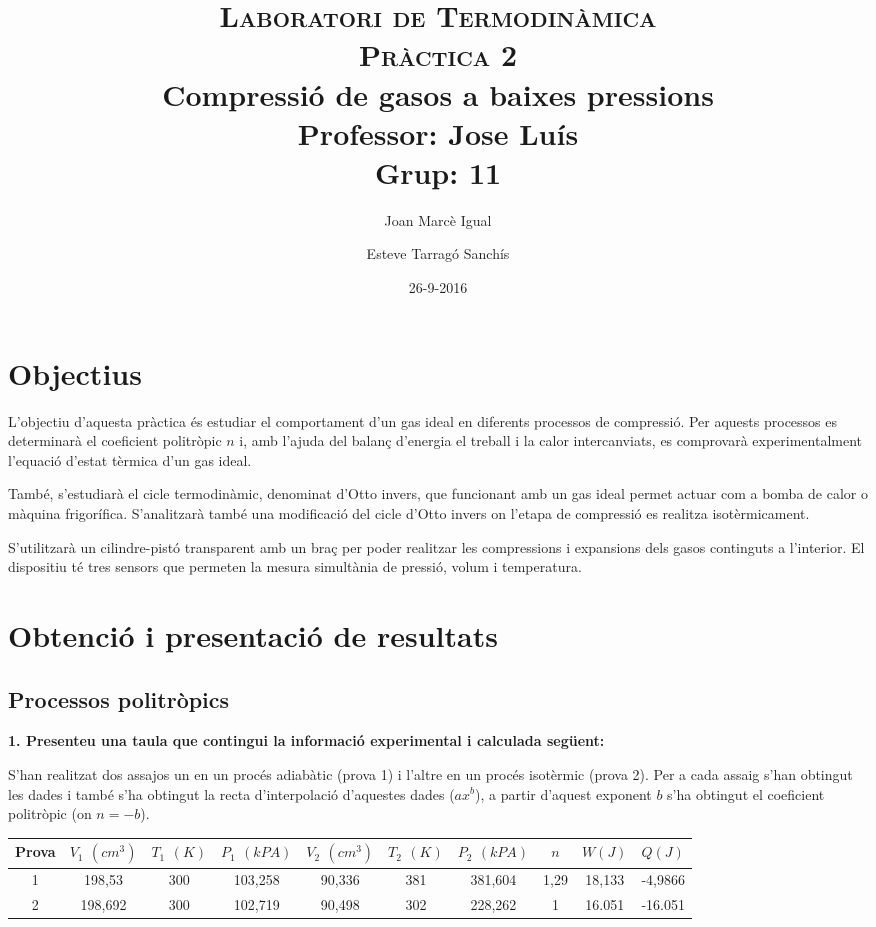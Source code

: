 \documentclass[a4paper]{article}
\title{\textsc{Laboratori de Termodinàmica} \\ \textsc{Pràctica 2} \\ Compressió de gasos a baixes pressions \\
    \large
    Professor: Jose Luís \\ Grup: 11 }
\author{Joan Marcè Igual \and Esteve Tarragó Sanchís}
\date{26-9-2016}
\begin{document}
\maketitle

\section*{Objectius}

L'objectiu d'aquesta pràctica és estudiar el comportament d'un gas ideal en diferents processos de compressió. Per aquests processos es determinarà el coeficient politròpic $n$ i, amb l'ajuda del balanç d'energia el treball i la calor intercanviats, es comprovarà experimentalment l'equació d'estat tèrmica d'un gas ideal. 

També, s'estudiarà el cicle termodinàmic, denominat d'Otto invers, que funcionant amb un gas ideal permet actuar com a bomba de calor o màquina frigorífica. S'analitzarà també una modificació del cicle d'Otto invers on l'etapa de compressió es realitza isotèrmicament.

S'utilitzarà un cilindre-pistó transparent amb un braç per poder realitzar les compressions i expansions dels gasos continguts a l'interior. El dispositiu té tres sensors que permeten la mesura simultània de pressió, volum i temperatura.

\section*{Obtenció i presentació de resultats}

\subsection*{Processos politròpics}

\textbf{1. Presenteu una taula que contingui la informació experimental i calculada següent:}

S'han realitzat dos assajos un en un procés adiabàtic (prova 1) i l'altre en un procés isotèrmic (prova 2). Per a cada assaig s'han obtingut les dades i també s'ha obtingut la recta d'interpolació d'aquestes dades ($ax^b$), a partir d'aquest exponent $b$ s'ha obtingut el coeficient politròpic (on $n = -b$).
\begin{center}
\begin{tabular}{c|ccccccccc}
    Prova & $V_1$ $(cm^3)$ & $T_1$ $(K)$ & $P_1$ $(kPA)$ & $V_2$ $(cm^3)$ & $T_2$ $(K)$ & $P_2$ $(kPA)$ & $n$ & $W(J)$ & $Q(J)$ \\
    \hline
    1 & 198,53 & 300 & 103,258 & 90,336 & 381 & 381,604 & 1,29 & 18,133 & -4,9866 \\
    2 & 198,692 & 300 & 102,719 & 90,498 & 302 & 228,262 & 1 & 16.051 & -16.051
\end{tabular}
\end{center}
\end{document}
